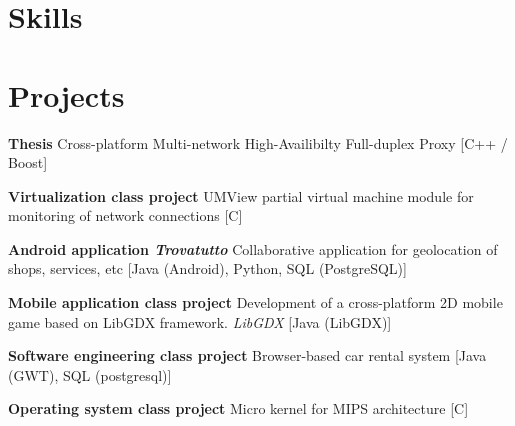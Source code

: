 \documentclass[11pt,a4paper,sans]{moderncv} %
\begin{document}



\section{Skills}



\section{Projects}
 {\textbf{Thesis} \newline Cross-platform Multi-network High-Availibilty Full-duplex Proxy [C++ / Boost]}

 {\textbf{Virtualization class project} \newline UMView partial virtual machine module for monitoring of network connections [C]}

 {\textbf{Android application {\em Trovatutto}} \newline Collaborative application for geolocation of shops, services, etc [Java (Android), Python, SQL (PostgreSQL)]}

 {\textbf{Mobile application class project} \newline Development of a cross-platform 2D mobile game based on LibGDX framework. {\em LibGDX} [Java (LibGDX)]}

 {\textbf{Software engineering class project} \newline Browser-based car rental system [Java (GWT), SQL (postgresql)]}

 {\textbf{Operating system class project} \newline Micro kernel for MIPS architecture [C]}
\end{document}
